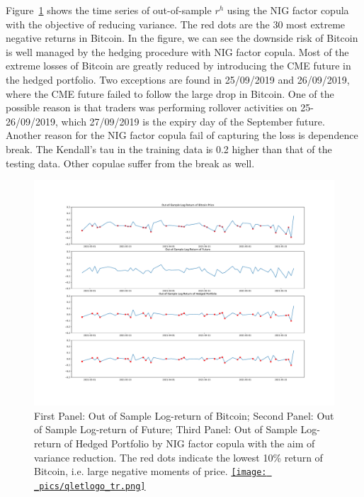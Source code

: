 Figure~\ref{fig:Gumbel} shows the time series of out-of-sample $r^h$ using the NIG factor copula with the
objective of reducing variance.
The red dots are the 30 most extreme negative returns in Bitcoin.
In the figure, we can see the downside risk of Bitcoin is well managed by the hedging procedure with NIG factor copula.
Most of the extreme losses of Bitcoin are greatly reduced by introducing the CME future in the hedged portfolio.
Two exceptions are found in 25/09/2019 and 26/09/2019, where the CME future failed to follow the large drop in Bitcoin.
One of the possible reason is that traders was performing rollover activities on 25-26/09/2019, which
27/09/2019 is the expiry day of the September future.
Another reason for the NIG factor copula fail of capturing the loss is dependence break.
The Kendall's tau in the training data is 0.2 higher than that of the testing data.
Other copulae suffer from the break as well. \medskip
%
\begin{figure}[th]
   \centering
   \includegraphics[width=\textwidth]{_pics/OOSreturns_compare.pdf}
   \caption{First Panel: Out of Sample Log-return of Bitcoin; Second Panel: Out of Sample Log-return of Future;
   Third Panel: Out of Sample Log-return of Hedged Portfolio by NIG factor copula with the aim of variance reduction.
   The red dots indicate the lowest 10\% return of Bitcoin, i.e. large negative moments of price.
   \href{http://www.quantlet.com/}{\texttt{[image: \_pics/qletlogo\_tr.png]}}}
   \label{fig:Gumbel}
\end{figure}

